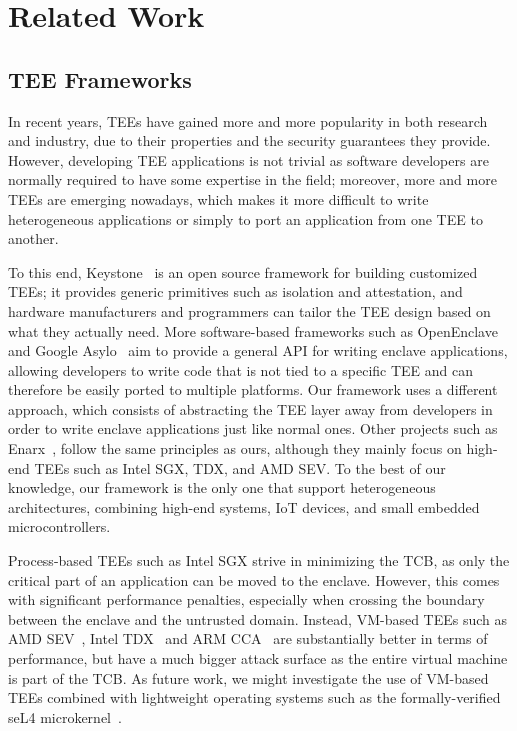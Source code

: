 \section{Related Work}
\label{sec:related-work}

\subsection{TEE Frameworks}

In recent years, \acp{TEE} have gained more and more popularity in both research
and industry, due to their properties and the security guarantees they provide.
However, developing \ac{TEE} applications is not trivial as software developers
are normally required to have some expertise in the field; moreover, more and
more \acp{TEE} are emerging nowadays, which makes it more difficult to write
heterogeneous applications or simply to port an application from one \ac{TEE} to
another. 

To this end, Keystone~\cite{lee2020keystone} is an open source framework for
building customized \acp{TEE}; it provides generic primitives such as isolation
and attestation, and hardware manufacturers and programmers can tailor the
\ac{TEE} design based on what they actually need. More software-based frameworks
such as OpenEnclave~\cite{openenclave} and Google Asylo~\cite{googleasylo} aim
to provide a general API for writing enclave applications, allowing developers
to write code that is not tied to a specific \ac{TEE} and can therefore be
easily ported to multiple platforms. Our framework uses a different approach,
which consists of abstracting the \ac{TEE} layer away from developers in order
to write enclave applications just like normal ones. Other projects such as
Enarx~\cite{enarx}, follow the same principles as ours, although they mainly
focus on high-end \acp{TEE} such as Intel \ac{SGX}, TDX, and AMD SEV. To the
best of our knowledge, our framework is the only one that support heterogeneous
architectures, combining high-end systems, IoT devices, and small embedded
microcontrollers.

Process-based \acp{TEE} such as Intel \ac{SGX} strive in minimizing the
\ac{TCB}, as only the critical part of an application can be moved to the
enclave. However, this comes with significant performance penalties, especially
when crossing the boundary between the enclave and the untrusted domain.
Instead, VM-based \acp{TEE} such as AMD SEV~\cite{AmdSevWhitepaper}, Intel
TDX~\cite{intelTdxWhitepaper} and ARM CCA~\cite{li2022design} are substantially better in
terms of performance, but have a much bigger attack surface as the entire
virtual machine is part of the \ac{TCB}. As future work, we might investigate
the use of VM-based \acp{TEE} combined with lightweight operating systems such
as the formally-verified seL4 microkernel~\cite{klein2009sel4}.

